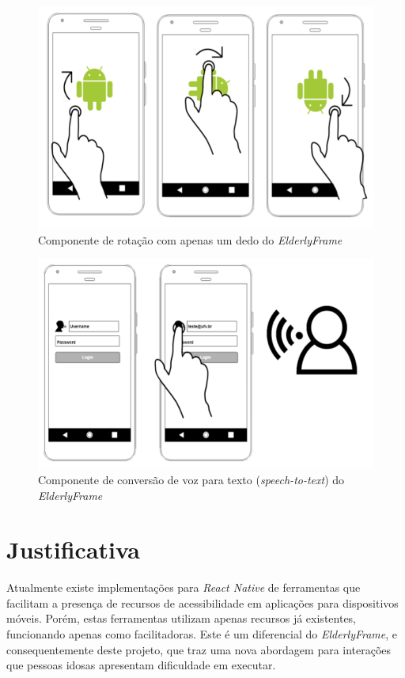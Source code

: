 \documentclass[
	12pt,				    %
	openright,			    %
	oneside,			    %
	a4paper,			    %
    sumario=tradicional,    %
	english,			    %
	brazil,				    %
	]{abntex2}              %
\begin{document}
\begin{figure}[H]
	\begin{center}
		\includegraphics[height=0.5\linewidth]{rotation.png}
	\end{center}
	\caption[Componente de Rotação com apenas um dedo]{Componente de rotação com apenas um dedo do \textit{ElderlyFrame}}
	\label{fig:rotation}
\end{figure}

\begin{figure}[H]
	\begin{center}
		\includegraphics[height=0.5\linewidth]{speech-to-text.png}
	\end{center}
	\caption[Speech To Text]{Componente de conversão de voz para texto (\textit{speech-to-text}) do \textit{ElderlyFrame}}
	\label{fig:speechToText}
\end{figure}

\chapter{Justificativa}\label{sec:justificativa}

Atualmente existe implementações para \textit{React Native} de ferramentas que facilitam a presença de recursos de acessibilidade em aplicações para dispositivos móveis. Porém, estas ferramentas utilizam apenas recursos já existentes, funcionando apenas como facilitadoras. Este é um diferencial do \textit{ElderlyFrame}, e consequentemente deste projeto, que traz uma nova abordagem para interações que pessoas idosas apresentam dificuldade em executar.
\end{document}
